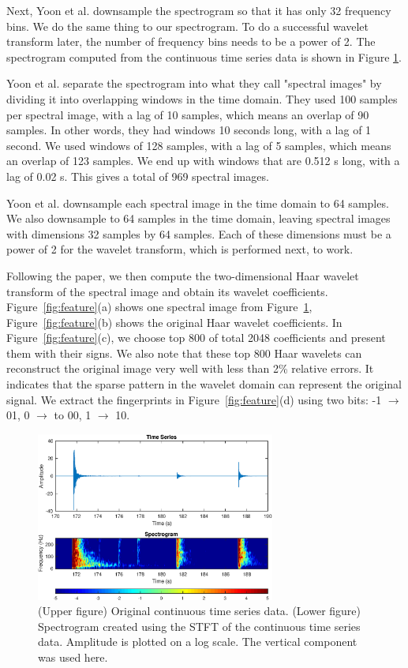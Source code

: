 Next, Yoon et al. downsample the spectrogram so that it has only 32 frequency bins. We do the same thing to our spectrogram. To do a successful wavelet transform later, the number of frequency bins needs to be a power of 2. The spectrogram computed from the continuous time series data is shown in Figure \ref{fig:spec}.

Yoon et al. separate the spectrogram into what they call "spectral images" by dividing it into overlapping windows in the time domain. They used 100 samples per spectral image, with a lag of 10 samples, which means an overlap of 90 samples. In other words, they had windows 10 seconds long, with a lag of 1 second. We used windows of 128 samples, with a lag of 5 samples, which means an overlap of 123 samples. We end up with windows that are 0.512 s long, with a lag of 0.02 s. This gives a total of 969 spectral images.

Yoon et al. downsample each spectral image in the time domain to 64 samples. We also downsample to 64 samples in the time domain, leaving spectral images with dimensions 32 samples by 64 samples. Each of these dimensions must be a power of 2 for the wavelet transform, which is performed next, to work. 

Following the paper, we then compute the two-dimensional Haar wavelet transform of the spectral image and obtain its wavelet coefficients. 
Figure~\ref{fig:feature}(a) shows one spectral image from Figure~\ref{fig:spec}, Figure~\ref{fig:feature}(b) shows the original Haar wavelet coefficients. In Figure~\ref{fig:feature}(c), we choose top 800 of total 2048 coefficients and present them with their signs. We also note that these top 800 Haar wavelets can reconstruct the original image very well with less than 2\% relative errors. 
It indicates that the sparse pattern in the wavelet domain can represent the original signal. 
We extract the fingerprints in Figure~\ref{fig:feature}(d) using two bits: -1 $\rightarrow$ 01, 0 $\rightarrow$ to 00, 1 $\rightarrow$ 10. 

\begin{figure}
	\centering
	\includegraphics[width=0.7\textwidth]{sampleSpectrogram}
	\caption{(Upper figure) Original continuous time series data. (Lower figure) Spectrogram created using the STFT of the continuous time series data. Amplitude is plotted on a log scale. The vertical component was used here.}
	\label{fig:spec}
\end{figure}

